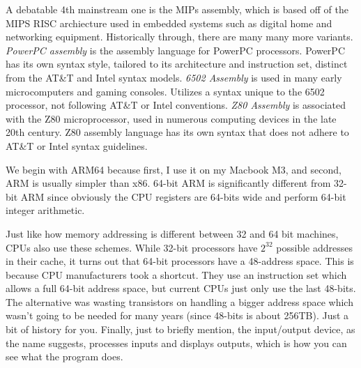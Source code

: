 A debatable 4th mainstream one is the MIPs assembly, which is based off of the MIPS RISC archiecture used in embedded systems such as digital home and networking equipment. Historically through, there are many many more variants. \textit{PowerPC assembly} is the assembly language for PowerPC processors. PowerPC has its own syntax style, tailored to its architecture and instruction set, distinct from the AT\&T and Intel syntax models. \textit{6502 Assembly} is used in many early microcomputers and gaming consoles. Utilizes a syntax unique to the 6502 processor, not following AT\&T or Intel conventions. \textit{Z80 Assembly} is associated with the Z80 microprocessor, used in numerous computing devices in the late 20th century. Z80 assembly language has its own syntax that does not adhere to AT\&T or Intel syntax guidelines.

We begin with ARM64 because first, I use it on my Macbook M3, and second, ARM is usually simpler than x86. 64-bit ARM is significantly different from 32-bit ARM since obviously the CPU registers are 64-bits wide and perform 64-bit integer arithmetic. 

Just like how memory addressing is different between 32 and 64 bit machines, CPUs also use these schemes. While 32-bit processors have $2^{32}$ possible addresses in their cache, it turns out that 64-bit processors have a 48-address space. This is because CPU manufacturers took a shortcut. They use an instruction set which allows a full 64-bit address space, but current CPUs just only use the last 48-bits. The alternative was wasting transistors on handling a bigger address space which wasn't going to be needed for many years (since 48-bits is about 256TB). Just a bit of history for you. Finally, just to briefly mention, the input/output device, as the name suggests, processes inputs and displays outputs, which is how you can see what the program does. 

